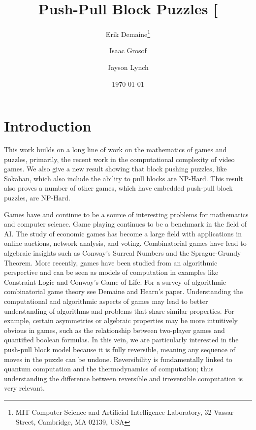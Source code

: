 \documentclass[11pt]{article}
\makeatletter
\gdef\xxx{\@ifnextchar[\xxx@lab\xxx@nolab}
\makeatother
\begin{document}
\title{Push-Pull Block Puzzles \xxx{title}}
\author{Erik Demaine\thanks{MIT Computer Science and Artificial Intelligence Laboratory, 32 Vassar Street,
Cambridge, MA 02139, USA} \and Isaac Grosof\footnotemark[1]  \and Jayson Lynch\footnotemark[1]}
\date{\today}
\maketitle



\section{Introduction} 

This work builds on a long line of work on the mathematics of games and puzzles, primarily, the recent work in the computational complexity of video games.  We also give a new result showing that block pushing puzzles, like Sokaban, which also include the ability to pull blocks are NP-Hard. This result also proves a number of other games, which have embedded push-pull block puzzles, are NP-Hard.

Games have and continue to be a source of interesting problems for mathematics and computer science. Game playing continues to be a benchmark in the field of AI. The study of economic games has become a large field with applications in online auctions\cite{auctions}, network analysis\cite{Internet}, and voting\cite{colman2013game}. Combinatorial games have lead to algebraic insights such as Conway's Surreal Numbers\cite{Surreal01} and the Sprague-Grundy Theorem\cite{Sprague35}\cite{Grundy39}. More recently, games have been studied from an algorithmic perspective and can be seen as models of computation in examples like Constraint Logic \cite{GPCBook09} and Conway's Game of Life\cite{LifeTuring01}. For a survey of algorithmic combinatorial game theory see Demaine and Hearn's paper\cite{AlgGameTheory_GONC3}. Understanding the computational and algorithmic aspects of games may lead to better understanding of algorithms and problems that share similar properties. For example, certain asymmetries or algebraic properties may be more intuitively obvious in games, such as the relationship between two-player games and quantified boolean formulas\cite{}. In this vein, we are particularly interested in the push-pull block model because it is fully reversible, meaning any sequence of moves in the puzzle can be undone. Reversibility is fundamentally linked to quantum computation and the thermodynamics of computation; thus understanding the difference between reversible and irreversible computation is very relevant. 
\end{document}
